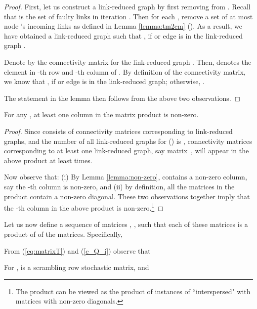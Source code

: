 \documentclass{llncs}
\newcommand{\fillbox}{\hspace*{\fill}}
\begin{document}
\begin{proof}
First, let us construct a link-reduced graph  by first removing  from . Recall that  is the set of faulty links in iteration . Then for each , remove a set of at most  node 's incoming links as defined in Lemma \ref{lemma:tm2cm} (). As a result, we have obtained a link-reduced graph  such that , if  or edge
 is in the link-reduced graph .

Denote by  the connectivity matrix for the link-reduced graph . Then,  denotes the element
in -th row and -th column of . By definition of the connectivity matrix, we know that , if  or edge  is in the link-reduced graph; otherwise, .

The statement in the lemma then follows from the above two observations.
\fillbox
\end{proof}



\begin{lemma}
\label{l_product_H}
For any ,
at least one column in the matrix product  is non-zero. 
\end{lemma}



\begin{proof}
Since  consists of  connectivity matrices
corresponding to link-reduced graphs, and the number of all link-reduced graphs for  () is ,
connectivity matrices corresponding to at least one link-reduced graph, say matrix \,, will appear in the above product at least  times.

Now observe that: (i)
By Lemma \ref{lemma:non-zero},  contains a non-zero
column, say the -th column is non-zero,
and (ii) by definition, all the  matrices in the product contain a non-zero diagonal. These two observations together imply that the -th column in the above product is non-zero.\footnote{The product  can be viewed as the product of  instances of  ``interspersed" with matrices with non-zero diagonals.}
\fillbox
\end{proof}


Let us now define a sequence of matrices , , such that
each of these matrices is a product of  of the
 matrices. Specifically,

From (\ref{eq:matrixT}) and (\ref{e_Q_i})
observe that



\begin{lemma}
\label{l_Q}
For ,  is a scrambling row stochastic matrix,
and 
\end{lemma}
\end{document}
